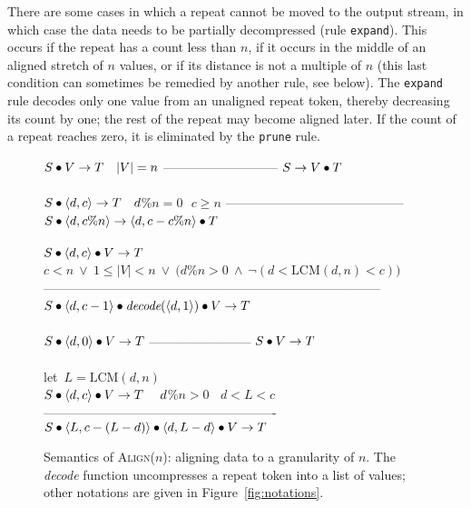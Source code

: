 There are some cases in which a repeat cannot be moved to the output
stream, in which case the data needs to be partially decompressed
(rule {\tt expand}).  This occurs if the repeat has a count less than
$n$, if it occurs in the middle of an aligned stretch of $n$ values,
or if its distance is not a multiple of $n$ (this last condition can
sometimes be remedied by another rule, see below).  The {\tt expand}
rule decodes only one value from an unaligned repeat token, thereby
decreasing its count by one; the rest of the repeat may become aligned
later.  If the count of a repeat reaches zero, it is eliminated by the
{\tt prune} rule.

\begin{figure}[t]
$S \bullet V \rightarrow T~~~|V|=n$\skiptopb
---------------------------\skipbot
$S \rightarrow V \bullet T$
~ \\ ~ \\
$S \bullet \langle d, c\rangle \rightarrow T~~~d$\%$n=0~~~c \ge n$\skiptopb
------------------------------------------\skipbot
$S \concat \tup{d}{c$\%$n} \rightarrow \tup{d}{c-c$\%$n} \concat T$
~ \\ ~ \\
$S \bullet \langle d, c\rangle \bullet V \rightarrow T$\\
$c<n~\vee~1 \le |V|<n~\vee~(d$\%$n>0~\wedge~\neg(d < \mbox{LCM}(d,n) < c))$\skiptopb
--------------------------------------------------------------------------------\skipbot
$S \bullet \langle d, c-1\rangle \bullet \mbox{\it decode}(\langle d, 1\rangle) \bullet V \rightarrow T$
~ \\ ~ \\
$S \bullet \langle d, 0\rangle \bullet V \rightarrow T$\skiptopb
------------------------\skipbot
$S \bullet V \rightarrow T$
~ \\ ~ \\
let~$L=\mbox{LCM}(d,n)$\\
$S \bullet \langle d, c\rangle \bullet V \rightarrow T~~~~d$\%$n > 0~~~~d < L < c$\vspace{-3pt}\skiptopa
-------------------------------------------------------\skipbot
$S \bullet \langle L, c-(L-d)\rangle \bullet \langle d, L-d\rangle \bullet V \rightarrow T$
\caption{Semantics of \textsc{Align}($n$): aligning data
to a granularity of $n$.  The \mbox{\it decode} function uncompresses
a repeat token into a list of values; other notations are given in
Figure~\ref{fig:notations}. \protect\label{fig:stream-align}}
\end{figure}

